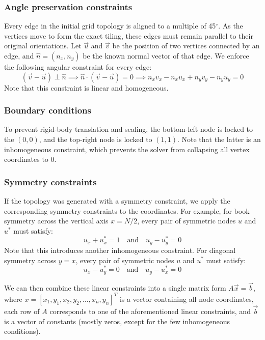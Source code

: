 \documentclass[11pt]{article}
\begin{document}
\subsubsection{Angle preservation constraints}
Every edge in the initial grid topology is aligned to a multiple of 45$^\circ$. As the vertices move to form the exact tiling, these edges must remain parallel to their original orientations. Let $\vec{u}$ and $\vec{v}$ be the position of two vertices connected by an edge, and $\hat{n} = (n_x, n_y)$ be the known normal vector of that edge. We enforce the following angular constraint for every edge:
\begin{equation}\label{eq:edge_angle}
    (\vec{v}-\vec{u}) \perp \hat{n}\implies {\hat{n} \cdot (\vec{v} - \vec{u})} = 0 \implies n_x v_x - n_x u_x + n_y v_y - n_y u_y = 0
\end{equation}
Note that this constraint is linear and homogeneous.

\subsubsection{Boundary conditions}
To prevent rigid-body translation and scaling, the bottom-left node is locked to the $(0,0)$, and the top-right node is locked to $(1,1)$. Note that the latter is an inhomogeneous constraint, which prevents the solver from collapsing all vertex coordinates to 0.

\subsubsection{Symmetry constraints}
If the topology was generated with a symmetry constraint, we apply the corresponding symmetry constraints to the coordinates. For example, for book symmetry across the vertical axis $x = N/2$, every pair of symmetric nodes $u$ and $u^*$ must satisfy:
\begin{equation}
    u_x + u^*_x = 1 \quad \text{and} \quad u_y - u^*_y = 0
\end{equation}
Note that this introduces another inhomogeneous constraint. For diagonal symmetry across $y = x$, every pair of symmetric nodes $u$ and $u^*$ must satisfy:
\begin{equation}
    u_x - u^*_y = 0 \quad \text{and} \quad u_y - u^*_x = 0
\end{equation}

We can then combine these linear constraints into a single matrix form $A\vec{x} = \vec{b}$, where $x = {[x_1, y_1, x_2, y_2, \ldots, x_n, y_n]}^T$ is a vector containing all node coordinates, each row of $A$ corresponds to one of the aforementioned linear constraints, and $\vec{b}$ is a vector of constants (mostly zeros, except for the few inhomogeneous conditions). 
\end{document}
